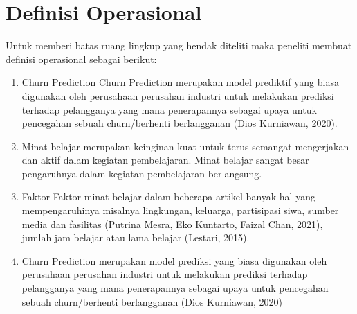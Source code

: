 \section{Definisi Operasional}

Untuk memberi batas ruang lingkup yang hendak diteliti maka peneliti membuat definisi operasional sebagai berikut: 
\begin{enumerate}
\item Churn Prediction Churn Prediction merupakan model prediktif yang biasa digunakan oleh perusahaan perusahan industri untuk melakukan prediksi terhadap pelangganya yang mana penerapannya sebagai upaya untuk pencegahan sebuah churn/berhenti berlangganan (Dios Kurniawan, 2020).

\item Minat belajar merupakan keinginan kuat untuk terus semangat mengerjakan dan aktif dalam kegiatan pembelajaran. Minat belajar         sangat besar pengaruhnya dalam kegiatan pembelajaran berlangsung.

\item Faktor Faktor minat belajar dalam beberapa artikel banyak hal yang mempengaruhinya misalnya lingkungan, keluarga, partisipasi siwa, sumber media dan fasilitas (Putrina Mesra, Eko Kuntarto, Faizal Chan, 2021), jumlah jam belajar atau lama belajar  (Lestari, 2015). 

\item Churn Prediction merupakan model prediksi yang biasa digunakan oleh perusahaan perusahan industri untuk melakukan prediksi terhadap pelangganya yang mana penerapannya sebagai upaya untuk pencegahan sebuah churn/berhenti berlangganan (Dios Kurniawan, 2020)
\end{enumerate}